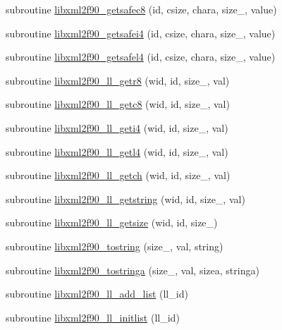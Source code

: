 \begin{DoxyCompactItemize}
\item 
subroutine \hyperlink{libxml2f90_8f90__pp_8f90_a9ba5ab680800c28b4f9d6ceb0e8aa3f4}{libxml2f90\+\_\+getsafec8} (id, csize, chara, size\+\_\+, value)
\item 
subroutine \hyperlink{libxml2f90_8f90__pp_8f90_ac813de3235a2af4f169c5434743f86a2}{libxml2f90\+\_\+getsafei4} (id, csize, chara, size\+\_\+, value)
\item 
subroutine \hyperlink{libxml2f90_8f90__pp_8f90_a28f8b34bc930ad861c2ee4d764f945ba}{libxml2f90\+\_\+getsafel4} (id, csize, chara, size\+\_\+, value)
\item 
subroutine \hyperlink{libxml2f90_8f90__pp_8f90_abf76069613613425c0bc9539a51cd4d9}{libxml2f90\+\_\+ll\+\_\+getr8} (wid, id, size\+\_\+, val)
\item 
subroutine \hyperlink{libxml2f90_8f90__pp_8f90_a6a5ed182d7a75ff001e4372fb131e07c}{libxml2f90\+\_\+ll\+\_\+getc8} (wid, id, size\+\_\+, val)
\item 
subroutine \hyperlink{libxml2f90_8f90__pp_8f90_a06d3fe6d9c7cd1a6044e617b8a2acdb9}{libxml2f90\+\_\+ll\+\_\+geti4} (wid, id, size\+\_\+, val)
\item 
subroutine \hyperlink{libxml2f90_8f90__pp_8f90_a71e6fc3f5a24b380986614bd6ff2ca9a}{libxml2f90\+\_\+ll\+\_\+getl4} (wid, id, size\+\_\+, val)
\item 
subroutine \hyperlink{libxml2f90_8f90__pp_8f90_a4f559755e5ceb6b3e6c845315d74ea7c}{libxml2f90\+\_\+ll\+\_\+getch} (wid, id, size\+\_\+, val)
\item 
subroutine \hyperlink{libxml2f90_8f90__pp_8f90_adbc34014dab0a252a634da0e15d1ae7d}{libxml2f90\+\_\+ll\+\_\+getstring} (wid, id, size\+\_\+, val)
\item 
subroutine \hyperlink{libxml2f90_8f90__pp_8f90_acfe9271d1d35656ab0b7c9ab2d303476}{libxml2f90\+\_\+ll\+\_\+getsize} (wid, id, size\+\_\+)
\item 
subroutine \hyperlink{libxml2f90_8f90__pp_8f90_ad6bcb9b8b86b4f88c534b842dc1bd9a1}{libxml2f90\+\_\+tostring} (size\+\_\+, val, string)
\item 
subroutine \hyperlink{libxml2f90_8f90__pp_8f90_a33b51f94ad4a4b0fabdf48039bd6a849}{libxml2f90\+\_\+tostringa} (size\+\_\+, val, sizea, stringa)
\item 
subroutine \hyperlink{libxml2f90_8f90__pp_8f90_a1eaede8d08ffde30b3ef74f657ac0126}{libxml2f90\+\_\+ll\+\_\+add\+\_\+list} (ll\+\_\+id)
\item 
subroutine \hyperlink{libxml2f90_8f90__pp_8f90_abd1f7aafd23265c8c8ed7934fff5af75}{libxml2f90\+\_\+ll\+\_\+initlist} (ll\+\_\+id)

\end{DoxyCompactItemize}
